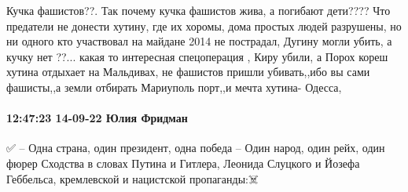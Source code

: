 Кучка фашистов??. Так почему кучка фашистов жива, а погибают дети???? Что
предатели не донести хутину, где их хоромы, дома простых людей разрушены, но ни
одного кто участвовал на майдане 2014 не пострадал, Дугину могли убить, а кучку
нет ??... какая то интересная спецоперация , Киру убили, а Порох кореш хутина
отдыхает на Мальдивах, не фашистов пришли убивать,,ибо вы сами фашисты,,а земли
отбирать Мариуполь порт,,и мечта хутина- Одесса,

\paragraph{12:47:23 14-09-22 Юлия Фридман}

✅ – Одна страна, один президент, одна победа
– Один народ, один рейх, один фюрер
Сходства в словах Путина и Гитлера, Леонида Слуцкого и Йозефа Геббельса, кремлевской и нацистской пропаганды:☠️👺
